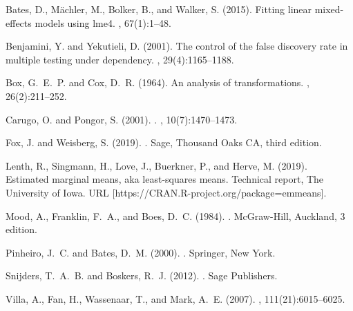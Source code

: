 \documentclass{article}\usepackage[table]{xcolor}
\renewcommand{\$}{$} %
\begin{document}
\begin{thebibliography}{}

Bates, D., M{\"a}chler, M., Bolker, B., and Walker, S. (2015).
\newblock Fitting linear mixed-effects models using {lme4}.
, 67(1):1--48.

Benjamini, Y. and Yekutieli, D. (2001).
\newblock The control of the false discovery rate in multiple testing under
  dependency.
, 29(4):1165--1188.

Box, G.~E.~P. and Cox, D.~R. (1964).
\newblock An analysis of transformations.
,
  26(2):211--252.

Carugo, O. and Pongor, S. (2001).
.
, 10(7):1470--1473.

Fox, J. and Weisberg, S. (2019).
.
\newblock Sage, Thousand Oaks {CA}, third edition.

Lenth, R., Singmann, H., Love, J., Buerkner, P., and Herve, M. (2019).
\newblock Estimated marginal means, aka least-squares means.
\newblock Technical report, The University of Iowa.
\newblock URL [https://CRAN.R-project.org/package=emmeans].

Mood, A., Franklin, F.~A., and Boes, D.~C. (1984).
.
\newblock McGraw-Hill, Auckland, 3 edition.

Pinheiro, J.~C. and Bates, D.~M. (2000).
.
\newblock Springer, New York.

Snijders, T.~A.~B. and Boskers, R.~J. (2012).
.
\newblock Sage Publishers.

Villa, A., Fan, H., Wassenaar, T., and Mark, A.~E. (2007).
, 111(21):6015--6025.


\end{thebibliography}
\end{document}
